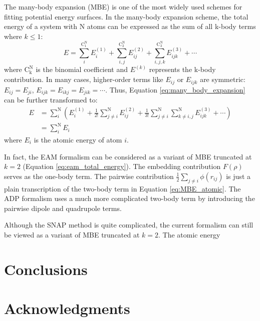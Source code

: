 \documentclass[prb,reprint]{revtex4-2}
\begin{document}
The many-body expansion (MBE) is one of the most widely used schemes for fitting 
potential energy surfaces. In the many-body expansion scheme, the total energy 
of a system with N atoms can be expressed as the sum of all k-body terms where 
$k \le 1$:
\begin{equation}
\label{eq:many_body_expansion}
E = 
\sum_{i}^{\mathrm{C^N_1}}{E^{(1)}_{i}} +
\sum_{i,j}^{\mathrm{C^N_2}}{E^{(2)}_{ij}} + 
\sum_{i,j,k}^{\mathrm{C^N_3}}{E^{(3)}_{ijk}} + \cdots 
\end{equation}
where $\mathrm{C^N_k}$ is the binomial coefficient and $E^{(k)}$ represents the 
k-body contribution. In many cases, higher-order terms like $E_{ij}$ or 
$E_{ijk}$ are symmetric: $E_{ij}=E_{ji}$, $E_{ijk}=E_{ikj}=E_{jik}=\cdots$. 
Thus, Equation \ref{eq:many_body_expansion} can be further transformed to:
\begin{align}
\label{eq:MBE_atomic}
E & = \sum_{i}^{\mathrm{N}}{\left(
    E^{(1)}_{i} + 
    \frac{1}{2!}\sum_{j \ne i}^{\mathrm{N}}{E^{(2)}_{ij}} +
    \frac{1}{3!}\sum_{j \ne i}^{\mathrm{N}}{
        \sum_{k \ne i,j}^{\mathrm{N}}{E^{(3)}_{ijk}}
    } +
    \cdots
\right)} \nonumber \\
& = \sum_{i}^{\mathrm{N}}{E_{i}}
\end{align}
where $E_{i}$ is the atomic energy of atom $i$. 

In fact, the EAM formalism can be considered as a variant of MBE truncated at 
$k=2$ (Equation \ref{eq:eam_total_energy}). The embedding contribution $F(\rho)$ 
serves as the one-body term. The pairwise contribution 
$\frac{1}{2}\sum_{j\ne i}{\phi(r_{ij})}$ is just a plain transcription of the 
two-body term in Equation \ref{eq:MBE_atomic}. The ADP formalism uses a much 
more complicated two-body term by introducing the pairwise dipole and quadrupole 
terms. 

Although the SNAP method is quite complicated, the current formalism can still 
be viewed as a variant of MBE truncated at $k=2$. The atomic energy 

% 
%
\section{Conclusions}
\label{sec:conclusions}

% 
%
\section*{Acknowledgments}
\label{sec:acknowledgments}

% 
%

\end{document}
